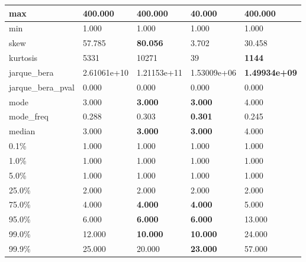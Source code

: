 \begin{table}[H]
\begin{tabular}{|l|m{10em}|m{10em}|m{10em}|m{10em}|}
\hline max & 400.000 & \bfseries 400.000 & \cellcolor[rgb]{0.9, 0.54, 0.52} 40.000 & \bfseries 400.000 \\
\hline min & 1.000 & 1.000 & 1.000 & 1.000 \\
\hline skew & 57.785 & \bfseries 80.056 & \cellcolor[rgb]{0.9, 0.54, 0.52} 3.702 & 30.458 \\
\hline kurtosis & 5331 & 10271 & \cellcolor[rgb]{0.9, 0.54, 0.52} 39 & \bfseries 1144 \\
\hline jarque\_bera & 2.61061e+10 & \cellcolor[rgb]{0.9, 0.54, 0.52} 1.21153e+11 & 1.53009e+06 & \bfseries 1.49934e+09 \\
\hline jarque\_bera\_pval & 0.000 & 0.000 & 0.000 & 0.000 \\
\hline mode & 3.000 & \bfseries 3.000 & \bfseries 3.000 & \cellcolor[rgb]{0.9, 0.54, 0.52} 4.000 \\
\hline mode\_freq & 0.288 & 0.303 & \bfseries 0.301 & \cellcolor[rgb]{0.9, 0.54, 0.52} 0.245 \\
\hline median & 3.000 & \bfseries 3.000 & \bfseries 3.000 & \cellcolor[rgb]{0.9, 0.54, 0.52} 4.000 \\
\hline 0.1\% & 1.000 & 1.000 & 1.000 & 1.000 \\
\hline 1.0\% & 1.000 & 1.000 & 1.000 & 1.000 \\
\hline 5.0\% & 1.000 & 1.000 & 1.000 & 1.000 \\
\hline 25.0\% & 2.000 & 2.000 & 2.000 & 2.000 \\
\hline 75.0\% & 4.000 & \bfseries 4.000 & \bfseries 4.000 & \cellcolor[rgb]{0.9, 0.54, 0.52} 5.000 \\
\hline 95.0\% & 6.000 & \bfseries 6.000 & \bfseries 6.000 & \cellcolor[rgb]{0.9, 0.54, 0.52} 13.000 \\
\hline 99.0\% & 12.000 & \bfseries 10.000 & \bfseries 10.000 & \cellcolor[rgb]{0.9, 0.54, 0.52} 24.000 \\
\hline 99.9\% & 25.000 & 20.000 & \bfseries 23.000 & \cellcolor[rgb]{0.9, 0.54, 0.52} 57.000 \\
\hline
\end{tabular}
\end{table}
